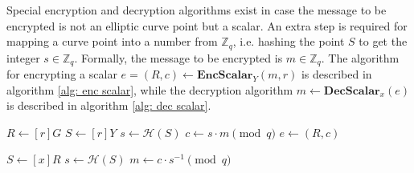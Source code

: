 Special encryption and decryption algorithms exist in case the message to be encrypted is not an elliptic curve point but a scalar. An extra step is required for mapping a curve point into a number from $\mathbb{Z}_q$, i.e. hashing the point $S$ to get the integer \( s \in \mathbb{Z}_q \). Formally, the message to be encrypted is \( m \in \mathbb{Z}_q \). The algorithm for encrypting a scalar \( e = (R, c) \leftarrow \mathbf{EncScalar}_Y (m, r) \) is described in algorithm \ref{alg: enc scalar}, while the decryption algorithm \( m \leftarrow \mathbf{DecScalar}_x (e) \) is described in algorithm \ref{alg: dec scalar}.

\begin{algorithm}[H]
\DontPrintSemicolon
    \caption{\( \mathbf{EncScalar}_Y (m, r) \)}
    \( R \gets [r]G \)\;
    \( S \gets [r]Y \)\;
    \( s \gets \mathcal{H} (S) \)\;
    \( c \gets s \cdot m \pmod q \)\;
    \( e \gets (R, c) \)\;
     
\end{algorithm}

\begin{algorithm}[H]
\DontPrintSemicolon
    \caption{\( \mathbf{DecScalar}_x (e) \)}
    \( S \gets [x]R \)\;
    \( s \gets \mathcal{H} (S) \)\;
    \( m \gets c \cdot s^{-1} \pmod q \)\;
     
\end{algorithm}

    
